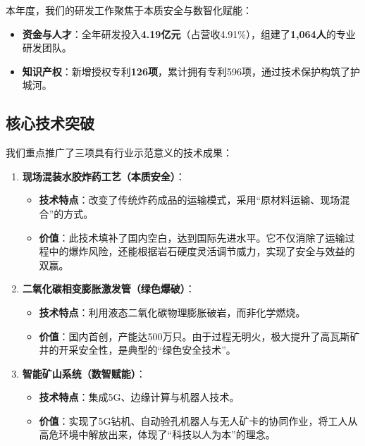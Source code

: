 \documentclass[a4paper,12pt]{article}
\begin{document}
本年度，我们的研发工作聚焦于本质安全与数智化赋能：
\begin{itemize}
    \item \textbf{资金与人才}：全年研发投入\textbf{4.19亿元}（占营收4.91\%），组建了\textbf{1,064人}的专业研发团队。
    \item \textbf{知识产权}：新增授权专利\textbf{126项}，累计拥有专利596项，通过技术保护构筑了护城河。
\end{itemize}

\subsection{核心技术突破}

我们重点推广了三项具有行业示范意义的技术成果：

\begin{enumerate}
    \item \textbf{现场混装水胶炸药工艺（本质安全）}：
    \begin{itemize}
        \item \textbf{技术特点}：改变了传统炸药成品的运输模式，采用“原材料运输、现场混合”的方式。
        \item \textbf{价值}：此技术填补了国内空白，达到国际先进水平。它不仅消除了运输过程中的爆炸风险，还能根据岩石硬度灵活调节威力，实现了安全与效益的双赢。
    \end{itemize}
    
    \item \textbf{二氧化碳相变膨胀激发管（绿色爆破）}：
    \begin{itemize}
        \item \textbf{技术特点}：利用液态二氧化碳物理膨胀破岩，而非化学燃烧。
        \item \textbf{价值}：国内首创，产能达500万只。由于过程无明火，极大提升了高瓦斯矿井的开采安全性，是典型的“绿色安全技术”。
    \end{itemize}
    
    \item \textbf{智能矿山系统（数智赋能）}：
    \begin{itemize}
        \item \textbf{技术特点}：集成5G、边缘计算与机器人技术。
        \item \textbf{价值}：实现了5G钻机、自动验孔机器人与无人矿卡的协同作业，将工人从高危环境中解放出来，体现了“科技以人为本”的理念。
    \end{itemize}
\end{enumerate}

\end{document}
